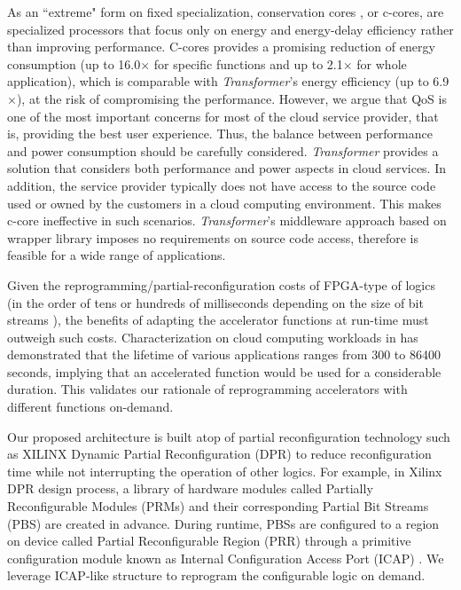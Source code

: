 As an ``extreme" form on fixed specialization, conservation cores
\cite{Venkatesh:2010:CCR:1735970.1736044,Venkatesh:2010:CCR:1736020.1736044,Venkatesh:2010:CCR:1735971.1736044},
or c-cores, are specialized processors that focus only on energy and
energy-delay efficiency rather than improving performance. C-cores
provides a promising reduction of energy consumption (up to
16.0$\times$ for specific functions and up to 2.1$\times$ for whole
application), which is comparable with {\em Transformer}'s energy
efficiency (up to 6.9$\times$), at the risk of compromising the
performance. However, we argue that QoS is one of the most important
concerns for most of the cloud service provider, that is, providing
the best user experience. Thus, the balance between performance and
power consumption should be carefully considered. {\em Transformer}
provides a solution that considers both performance and power aspects
in cloud services. In addition, the service provider typically does
not have access to the source code used or owned by the customers in a
cloud computing environment. This makes c-core ineffective in such scenarios. {\em Transformer}'s middleware approach based on wrapper library imposes no requirements on source code access, therefore is feasible for a wide range of applications. 

Given the reprogramming/partial-reconfiguration costs of FPGA-type of
logics (in the order of tens or hundreds of milliseconds depending on
the size of bit streams \cite{Liu:2009ie}), the benefits of adapting
the accelerator functions at run-time must outweigh such
costs. Characterization on cloud computing workloads in
\cite{CloudWorkload} has demonstrated that the lifetime of various
applications ranges from 300 to 86400 seconds, implying that an
accelerated function would be used for a considerable duration.  This
validates our rationale of reprogramming accelerators with different
functions on-demand.

Our proposed architecture is built atop of partial reconfiguration
technology such as XILINX Dynamic Partial Reconfiguration (DPR)
\cite{PRUserGuide} to reduce reconfiguration time while not
interrupting the operation of other logics. For example, in Xilinx DPR
design process, a library of hardware modules called Partially
Reconfigurable Modules (PRMs) and their corresponding Partial Bit
Streams (PBS) are created in advance. 
During runtime, PBSs are configured to a region on device called
Partial Reconfigurable Region (PRR) through a primitive configuration
module known as Internal Configuration Access Port (ICAP)
\cite{Hansen:2011dt,Liu:2009ie,McDonald:2008ec}. We leverage ICAP-like
structure to reprogram the configurable logic on demand.



